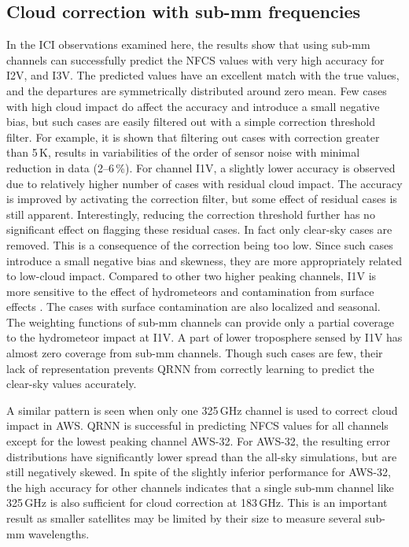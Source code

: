 \documentclass[amt, manuscript]{copernicus}
\begin{document}
\subsection{Cloud correction with sub-mm frequencies }
%
In the ICI observations examined here, the results show that using sub-mm channels can successfully predict the NFCS values with very high accuracy for I2V, and I3V. The predicted values have an excellent match with the true values, and the departures are symmetrically distributed around zero mean. Few cases with high cloud impact do affect the accuracy and introduce a small negative bias, but such cases are easily filtered out with a simple correction threshold filter. For example, it is shown that filtering out cases with correction greater than 5\,K, results in variabilities of the order of sensor noise with minimal reduction in data (2--6\,\%). For channel I1V, a slightly lower accuracy is observed due to relatively higher number of cases with residual cloud impact. The accuracy is improved by activating the correction filter, but some effect of residual cases is still apparent. Interestingly, reducing the correction threshold further has no significant effect on flagging these residual cases. In fact only clear-sky cases are removed. This is a consequence of the correction being too low. Since such cases introduce a small negative bias and skewness, they are more appropriately related to low-cloud impact. Compared to other two higher peaking channels, I1V is more sensitive to the effect of hydrometeors  and contamination from surface effects \citep[Fig. 4 of][]{eriksson:towar:20}. The cases with surface contamination are also localized and seasonal. The weighting functions of sub-mm channels can provide only a partial coverage to the hydrometeor impact at I1V. A part of lower troposphere sensed by I1V has almost zero coverage from sub-mm channels. Though such cases are few, their lack of representation prevents QRNN from correctly learning to predict the clear-sky values accurately.

A similar pattern is seen when only one 325\,GHz channel is used to correct cloud impact in AWS. QRNN is successful in predicting NFCS values for all channels except for the lowest peaking channel AWS-32. For AWS-32, the resulting error distributions have significantly lower spread than the all-sky simulations, but are still negatively skewed. In spite of the slightly inferior performance for AWS-32, the high accuracy for other channels indicates that a single sub-mm channel like 325\,GHz is also sufficient for cloud correction at 183\,GHz. This is an important result as smaller satellites may be limited by their size to measure several sub-mm wavelengths.
\end{document}
